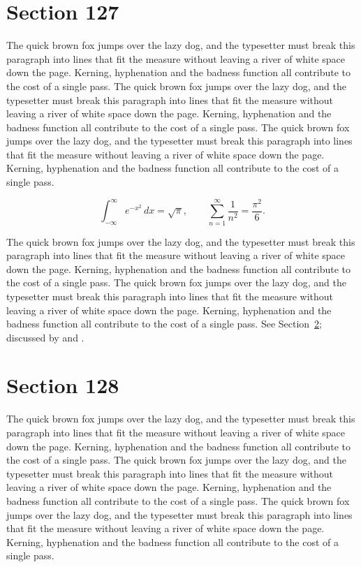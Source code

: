 \documentclass{article}
\begin{document}
\section{Section 127}
\label{sec:127}
The quick brown fox jumps over the lazy dog, and the typesetter must break this paragraph into lines that fit the measure without leaving a river of white space down the page. Kerning, hyphenation and the badness function all contribute to the cost of a single pass. The quick brown fox jumps over the lazy dog, and the typesetter must break this paragraph into lines that fit the measure without leaving a river of white space down the page. Kerning, hyphenation and the badness function all contribute to the cost of a single pass. The quick brown fox jumps over the lazy dog, and the typesetter must break this paragraph into lines that fit the measure without leaving a river of white space down the page. Kerning, hyphenation and the badness function all contribute to the cost of a single pass. 

\begin{equation}\label{eq:127}
\int_{-\infty}^{\infty} e^{-x^{2}}\,dx = \sqrt{\pi}, \qquad
\sum_{n=1}^{\infty} \frac{1}{n^{2}} = \frac{\pi^{2}}{6}.
\end{equation}

The quick brown fox jumps over the lazy dog, and the typesetter must break this paragraph into lines that fit the measure without leaving a river of white space down the page. Kerning, hyphenation and the badness function all contribute to the cost of a single pass. The quick brown fox jumps over the lazy dog, and the typesetter must break this paragraph into lines that fit the measure without leaving a river of white space down the page. Kerning, hyphenation and the badness function all contribute to the cost of a single pass. 
See Section~\ref{sec:128}; discussed by \textcite{k3} and \textcite{l5}.
\section{Section 128}
\label{sec:128}
The quick brown fox jumps over the lazy dog, and the typesetter must break this paragraph into lines that fit the measure without leaving a river of white space down the page. Kerning, hyphenation and the badness function all contribute to the cost of a single pass. The quick brown fox jumps over the lazy dog, and the typesetter must break this paragraph into lines that fit the measure without leaving a river of white space down the page. Kerning, hyphenation and the badness function all contribute to the cost of a single pass. The quick brown fox jumps over the lazy dog, and the typesetter must break this paragraph into lines that fit the measure without leaving a river of white space down the page. Kerning, hyphenation and the badness function all contribute to the cost of a single pass. 
\end{document}
